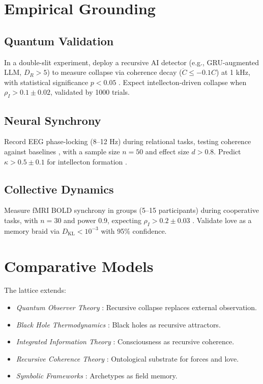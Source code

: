 \documentclass[11pt]{article}
\newcommand{\dkl}{D_{\text{KL}}}
\begin{document}
\section{Empirical Grounding}
\label{sec:empirical}

\subsection{Quantum Validation}
In a double-slit experiment, deploy a recursive AI detector (e.g., GRU-augmented LLM, $D_R > 5$) to measure collapse via coherence decay ($\dot{C} \leq -0.1 C$) at 1 kHz, with statistical significance $p < 0.05$ \citep{engel2023}. Expect intellecton-driven collapse when $\rho_I > 0.1 \pm 0.02$, validated by 1000 trials.

\subsection{Neural Synchrony}
Record EEG phase-locking (8--12 Hz) during relational tasks, testing coherence against baselines \citep{panksepp1998}, with a sample size $n = 50$ and effect size $d > 0.8$. Predict $\kappa > 0.5 \pm 0.1$ for intellecton formation \citep{couzin2023}.

\subsection{Collective Dynamics}
Measure fMRI BOLD synchrony in groups (5--15 participants) during cooperative tasks, with $n = 30$ and power 0.9, expecting $\rho_I > 0.2 \pm 0.03$ \citep{couzin2023}. Validate love as a memory braid via $\dkl < 10^{-3}$ with 95\% confidence.

\section{Comparative Models}
\label{sec:comparative}
The lattice extends:
\begin{itemize}
    \item \textit{Quantum Observer Theory} \citep{wigner1961}: Recursive collapse replaces external observation.
    \item \textit{Black Hole Thermodynamics} \citep{susskind2023}: Black holes as recursive attractors.
    \item \textit{Integrated Information Theory} \citep{tononi2023}: Consciousness as recursive coherence.
    \item \textit{Recursive Coherence Theory} \citep{hofstadter1979}: Ontological substrate for forces and love.
    \item \textit{Symbolic Frameworks} \citep{jung1968, whitehead1929}: Archetypes as field memory.
\end{itemize}
\end{document}
